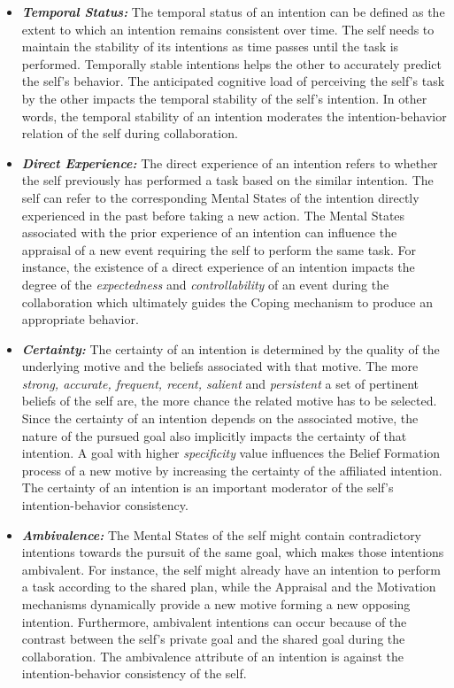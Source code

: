 \documentclass[letterpaper]{article}
\begin{document}
\begin{itemize}
  \item \textbf{\textit{Temporal Status:}} The temporal status of an intention
  can be defined as the extent to which an intention remains consistent over
  time. The self needs to maintain the stability of its intentions as time
  passes until the task is performed. Temporally stable intentions helps the
  other to accurately predict the self's behavior. The anticipated cognitive
  load of perceiving the self's task by the other impacts the temporal stability
  of the self's intention. In other words, the temporal stability of an
  intention moderates the intention-behavior relation of the self during
  collaboration.
  
  \item \textbf{\textit{Direct Experience:}} The direct experience of an
  intention refers to whether the self previously has performed a task based on
  the similar intention. The self can refer to the corresponding Mental States
  of the intention directly experienced in the past before taking a new action.
  The Mental States associated with the prior experience of an intention can
  influence the appraisal of a new event requiring the self to perform the same
  task. For instance, the existence of a direct experience of an intention
  impacts the degree of the \textit{expectedness} and \textit{controllability}
  of an event during the collaboration which ultimately guides the Coping
  mechanism to produce an appropriate behavior.
  
  \item \textbf{\textit{Certainty:}} The certainty of an intention is determined
  by the quality of the underlying motive and the beliefs associated with that
  motive. The more \textit{strong, accurate, frequent, recent, salient} and
  \textit{persistent} a set of pertinent beliefs of the self are, the more
  chance the related motive has to be selected. Since the certainty of an
  intention depends on the associated motive, the nature of the pursued goal also
  implicitly impacts the certainty of that intention. A goal with higher
  \textit{specificity} value influences the Belief Formation process of a new
  motive by increasing the certainty of the affiliated intention. The certainty
  of an intention is an important moderator of the self's intention-behavior
  consistency.
  
  \item \textbf{\textit{Ambivalence:}} The Mental States of the self might
  contain contradictory intentions towards the pursuit of the same goal, which
  makes those intentions ambivalent. For instance, the self might already have
  an intention to perform a task according to the shared plan, while the Appraisal
  and the Motivation mechanisms dynamically provide a new motive forming a new
  opposing intention. Furthermore, ambivalent intentions can occur because of
  the contrast between the self's private goal and the shared goal during the
  collaboration. The ambivalence attribute of an intention is against the
  intention-behavior consistency of the self.
  

\end{itemize}
\end{document}
